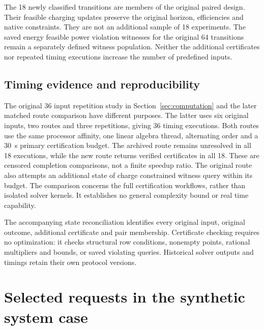 The 18 newly classified transitions are members of the original paired
design. Their feasible charging updates preserve the original horizon,
efficiencies and native constraints. They are not an additional sample of
18 experiments. The saved energy feasible power violation witnesses for
the original 64 transitions remain a separately defined witness population.
Neither the additional certificates nor repeated timing executions increase
the number of predefined inputs.

\subsection{Timing evidence and reproducibility}
The original 36 input repetition study in Section~\ref{sec:computation}
and the later matched route comparison have different purposes. The latter
uses six original inputs, two routes and three repetitions, giving 36 timing
executions. Both routes use the same processor affinity, one linear algebra
thread, alternating order and a 30~s primary certification budget. The
archived route remains unresolved in all 18 executions, while the new route
returns verified certificates in all 18. These are censored completion
comparisons, not a finite speedup ratio. The original route also attempts
an additional state of charge constrained witness query within its budget.
The comparison concerns the full certification workflows, rather than
isolated solver kernels. It establishes no general complexity bound or
real time capability.

The accompanying state reconciliation identifies every original input,
original outcome, additional certificate and pair membership. Certificate
checking requires no optimization: it checks structural row conditions,
nonempty points, rational multipliers and bounds, or saved violating queries.
Historical solver outputs and timings retain their own protocol versions.



\section{Selected requests in the synthetic system case}
\label{sec:sat_selected_requests}

